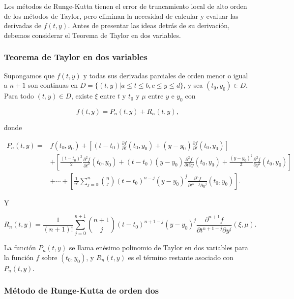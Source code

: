 Los métodos de Runge-Kutta tienen el error de truncamiento local de alto orden de los métodos de Taylor, pero eliminan la necesidad de calcular y evaluar las derivadas de $f(t, y)$. Antes de presentar las ideas detrás de su derivación, debemos considerar el Teorema de Taylor en dos variables.

\subsubsection*{Teorema de Taylor en dos variables}
Supongamos que $f(t, y)$ y todas sus derivadas parciales de orden menor o igual a $n+1$ son continuas en $D = \{ (t, y) | a\leq t \leq b, c \leq y \leq d \}$, y sea $(t_0, y_0) \in D$. Para todo $(t, y) \in D$, existe $\xi$ entre $t$ y $t_0$ y $\mu$ entre $y$ e $y_0$ con

\begin{equation*}
    f(t,y)=P_n(t,y)+R_n(t,y),
\end{equation*}

donde

\begin{equation*}
\begin{split}
    P_n(t,y)=&f(t_0,y_0)+ \left[ (t-t_0)\frac{\partial f}{\partial t} (t_0,y_0) + (y-y_0)\frac{\partial f}{\partial t} (t_0,y_0) \right] \\ 
    & + \left[ \frac{(t-t_0)^2}{2}\frac{\partial^2 f}{\partial t^2} (t_0,y_0) + (t-t_0)(y-y_0)\frac{\partial^2 f}{\partial t \partial y} (t_0,y_0) + \frac{(y-y_0)^2}{2}\frac{\partial^2 f}{\partial y^2}(t_0,y_0) \right] \\
    & + \dotsi + \left[ \frac{1}{n!} \sum_{j=0}^n \binom{n}{j}(t-t_0)^{n-j}(y-y_0)^j \frac{\partial^n f}{\partial t^{n-j} \partial y^j}(t_0,y_0) \right].
\end{split}
\end{equation*}

Y

\begin{equation*}
    R_n(t,y)=\frac{1}{(n+1)!} \sum_{j=0}^{n+1} \binom{n+1}{j}(t-t_0)^{n+1-j}(y-y_0)^j \frac{\partial^{n+1}f}{\partial t^{n+1-j} \partial y^j}(\xi,\mu).
\end{equation*}

La función $P_n(t, y)$ se llama enésimo polinomio de Taylor en dos variables para la función $f$ sobre $(t_0, y_0)$, y $R_n(t, y)$ es el término restante asociado con $P_n(t, y)$.

\subsubsection*{Método de Runge-Kutta de orden dos}

